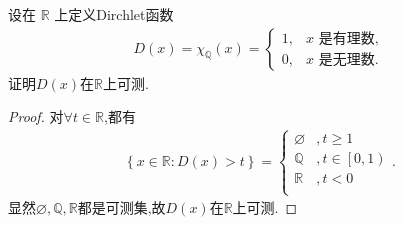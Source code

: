 \documentclass[../../main.tex]{subfiles}%
\begin{document}
\begin{example}
设在 \(\mathbb{R}\) 上定义Dirchlet函数
\begin{align*}
D(x)=\chi_{\mathbb{Q}}(x)=\begin{cases}
1, & x\text{ 是有理数},\\
0, & x\text{ 是无理数}.
\end{cases}
\end{align*}
证明$D(x)$在$\mathbb{R}$上可测.
\end{example}
\begin{proof}
对$\forall t\in \mathbb{R}$,都有
\begin{align*}
\left\{ x\in \mathbb{R} :D\left( x \right) >t \right\} =\begin{cases}
\varnothing &,t\geqslant 1\\
\mathbb{Q} &,t\in \left[ 0,1 \right)\\
\mathbb{R} &,t<0\\
\end{cases}.
\end{align*}
显然$\varnothing,\mathbb{Q},\mathbb{R}$都是可测集,故$D\left( x \right)$在$\mathbb{R}$上可测.
\end{proof}
\end{document}
